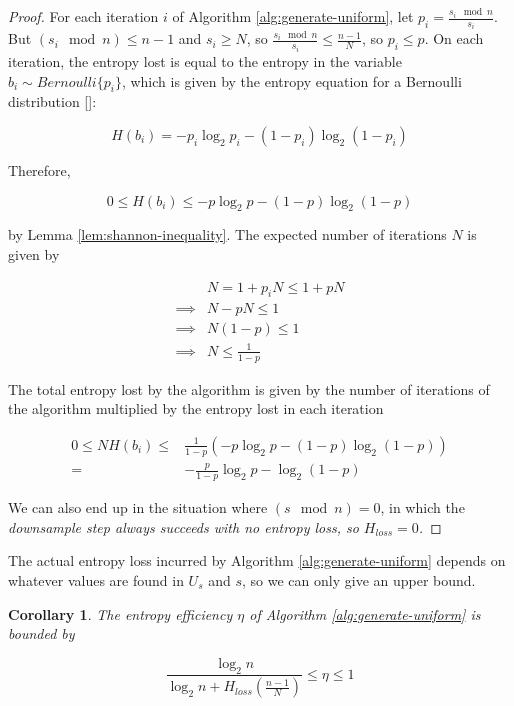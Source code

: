 \documentclass[12pt]{article}
\newtheorem{corollary}{Corollary}
\begin{document}
\begin{proof}
For each iteration $i$ of Algorithm \ref{alg:generate-uniform}, let $p_i = \frac{s_i \mod n}{s_i}$. But $(s_i \mod n) \le n-1$ and $s_i \ge N$, so $\frac{s_i \mod n}{s_i} \le \frac{n-1}{N}$, so $p_i \le p$. On each iteration, the entropy lost is equal to the entropy in the variable $b_i \sim Bernoulli\{p_i\}$, which is given by the entropy equation for a Bernoulli distribution []:

\begin{equation}
H(b_i) = -p_i\log_2p_i - (1-p_i)\log_2(1-p_i)
\end{equation}

Therefore, 

\begin{equation}
0 \le H(b_i) \le -p\log_2p - (1-p)\log_2(1-p) 
\end{equation}


by Lemma \ref{lem:shannon-inequality}. The expected number of iterations $N$ is given by

\begin{align}
& N = 1 + p_iN \le 1 + pN \\
\implies & N-pN \le 1 \\
\implies & N(1-p) \le 1 \\
\implies & N \le \frac{1}{1-p}
\end{align}

The total entropy lost by the algorithm is given by the number of iterations of the algorithm multiplied by the entropy lost in each iteration

\begin{align}
0 \le NH(b_i) \le & \frac{1}{1-p}(-p\log_2p - (1-p)\log_2(1-p) ) \\
= & -\frac{p}{1-p}\log_2p - \log_2(1-p)
\end{align}

We can also end up in the situation where $(s \mod n) = 0$, in which the \em downsample \em step always succeeds with no entropy loss, so $H_{loss}=0$.
\end{proof}

The actual entropy loss incurred by Algorithm \ref{alg:generate-uniform} depends on whatever values are found in $U_s$ and $s$, so we can only give an upper bound.

\begin{corollary}
The entropy efficiency $\eta$ of Algorithm \ref{alg:generate-uniform} is bounded by

\begin{equation}
\frac{\log_2n}{\log_2n + H_{loss}(\frac{n-1}{N})} \le \eta \le 1
\end{equation}
\label{cor:generate-uniform-efficiency}
\end{corollary}
\end{document}
